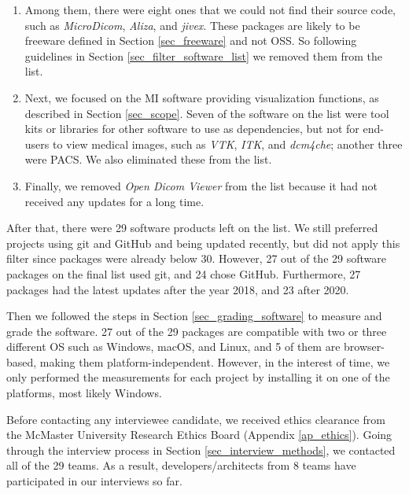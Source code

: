 \begin{enumerate}
\item Among them, there were eight ones that we could not find their source code, such as \textit{MicroDicom}, \textit{Aliza}, and \textit{jivex}. These packages are likely to be freeware defined in Section \ref{sec_freeware} and not OSS. So following guidelines in Section \ref{sec_filter_software_list} we removed them from the list.

\item Next, we focused on the MI software providing visualization functions, as described in Section \ref{sec_scope}. Seven of the software on the list were tool kits or libraries for other software to use as dependencies, but not for end-users to view medical images, such as \textit{VTK}, \textit{ITK}, and \textit{dcm4che}; another three were PACS. We also eliminated these from the list.

\item Finally, we removed \textit{Open Dicom Viewer} from the list because it had not received any updates for a long time.
\end{enumerate}

After that, there were 29 software products left on the list. We still preferred projects using git and GitHub and being updated recently, but did not apply this filter since packages were already below 30. However, 27 out of the 29 software packages on the final list used git, and 24 chose GitHub. Furthermore, 27 packages had the latest updates after the year 2018, and 23 after 2020.

Then we followed the steps in Section \ref{sec_grading_software} to measure and grade the software. 27 out of the 29 packages are compatible with two or three different OS such as Windows, macOS, and Linux, and 5 of them are browser-based, making them platform-independent. However, in the interest of time, we only performed the measurements for each project by installing it on one of the platforms, most likely Windows.

Before contacting any interviewee candidate, we received ethics clearance from the McMaster University Research Ethics Board (Appendix \ref{ap_ethics}). Going through the interview process in Section \ref{sec_interview_methods}, we contacted all of the 29 teams. As a result, developers/architects from 8 teams have participated in our interviews so far.
